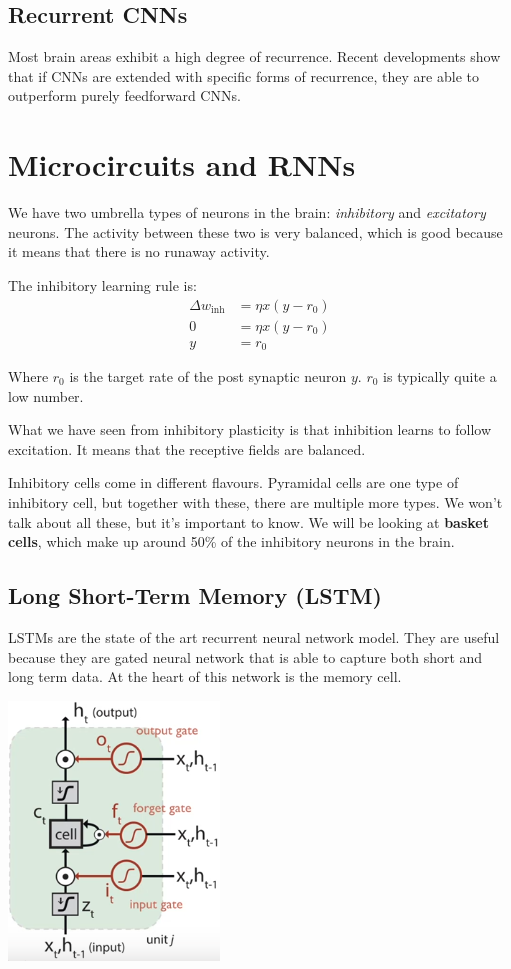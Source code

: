 \documentclass[11pt,a4paper,titlepage,dvipsnames,cmyk]{scrartcl}
\begin{document}
\subsection{Recurrent CNNs}
Most brain areas exhibit a high degree of recurrence. Recent developments show that if CNNs are extended with specific forms of recurrence, they are able to outperform purely feedforward CNNs.

\section{Microcircuits and RNNs}
We have two umbrella types of neurons in the brain: \textit{inhibitory} and \textit{excitatory} neurons. The activity between these two is very balanced, which is good because it means that there is no runaway activity.

The inhibitory learning rule is:
\begin{align*}
\Delta w_{\text{inh}} &= \eta x (y - r_0) \\
0 &= \eta x(y-r_0) \\
y &= r_0
\end{align*}

Where $r_0$ is the target rate of the post synaptic neuron $y$. $r_0$ is typically quite a low number.

What we have seen from inhibitory plasticity is that inhibition learns to follow excitation. It means that the receptive fields are balanced.

Inhibitory cells come in different flavours. Pyramidal cells are one type of inhibitory cell, but together with these, there are multiple more types. We won't talk about all these, but it's important to know. We will be looking at \textbf{basket cells}, which make up around 50\% of the inhibitory neurons in the brain.

\subsection{Long Short-Term Memory (LSTM)}
LSTMs are the state of the art recurrent neural network model. They are useful because they are gated neural network that is able to capture both short and long term data. At the heart of this network is the memory cell.

\begin{center}
    \includegraphics[scale=.7]{memory_cell.png}
\end{center}
\end{document}
